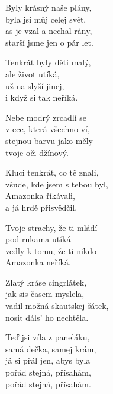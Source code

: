 
\ve{}
Byly krásný naše plány,\\
byla jsi můj celej svět, \\
as je vzal a nechal rány,\\
starší jsme jen o pár let. 

\vspace*{-2pt}

Tenkrát byly děti malý, \\
ale život utíká, \\
už na  slyší jinej, \\
i když si tak neříká. 

\vspace*{-2pt}

\cho{}
Nebe modrý zrcadlí se \\
v ece, která všechno ví, \\
stejnou barvu jako měly \\
tvoje oči džínový. 
 
\ve{}
Kluci tenkrát, co tě znali, \\
všude, kde jsem s tebou byl, \\
Amazonka říkávali, \\
a já hrdě přisvědčil.

\vspace*{-2pt}

Tvoje strachy, že ti mládí \\
pod rukama utíká \\
vedly k tomu, že ti nikdo \\
Amazonka neříká.

\vspace*{-2pt}

\cho{}

\ve{}
Zlatý kráse cingrlátek, \\
jak sis časem myslela, \\
vadil možná skautskej šátek, \\
nosit dáls' ho nechtěla.

\cho{}
Teď jsi víla z paneláku, \\
samá dečka, samej krám, \\
já si přál jen, abys byla \\
pořád stejná, přísahám, \\
pořád stejná, přísahám. 
\vspace*{-5pt}

\esong{}